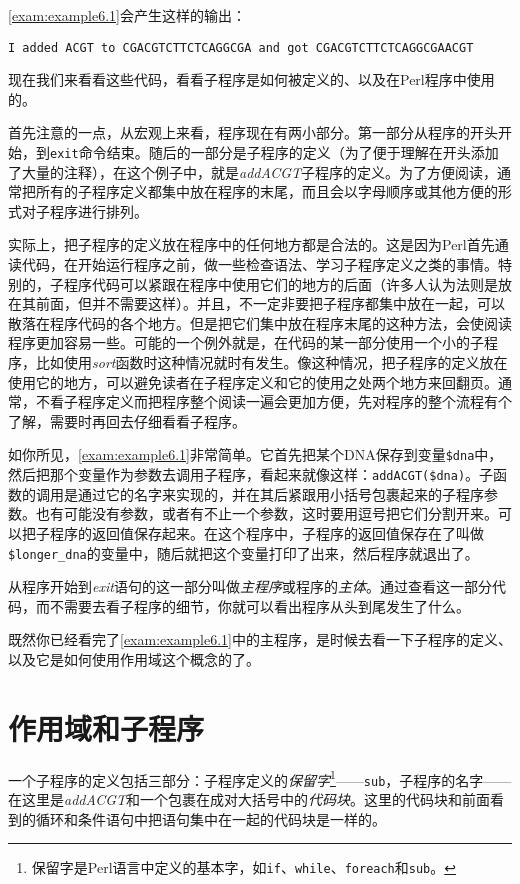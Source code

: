 \autoref{exam:example6.1}会产生这样的输出：

\begin{lstlisting}
I added ACGT to CGACGTCTTCTCAGGCGA and got CGACGTCTTCTCAGGCGAACGT
\end{lstlisting}

现在我们来看看这些代码，看看子程序是如何被定义的、以及在Perl程序中使用的。

首先注意的一点，从宏观上来看，程序现在有两小部分。第一部分从程序的开头开始，到\verb|exit|命令结束。随后的一部分是子程序的定义（为了便于理解在开头添加了大量的注释），在这个例子中，就是\textit{addACGT}子程序的定义。为了方便阅读，通常把所有的子程序定义都集中放在程序的末尾，而且会以字母顺序或其他方便的形式对子程序进行排列。

实际上，把子程序的定义放在程序中的任何地方都是合法的。这是因为Perl首先通读代码，在开始运行程序之前，做一些检查语法、学习子程序定义之类的事情。特别的，子程序代码可以紧跟在程序中使用它们的地方的后面（许多人认为法则是放在其前面，但并不需要这样）。并且，不一定非要把子程序都集中放在一起，可以散落在程序代码的各个地方。但是把它们集中放在程序末尾的这种方法，会使阅读程序更加容易一些。可能的一个例外就是，在代码的某一部分使用一个小的子程序，比如使用\textit{sort}函数时这种情况就时有发生。像这种情况，把子程序的定义放在使用它的地方，可以避免读者在子程序定义和它的使用之处两个地方来回翻页。通常，不看子程序定义而把程序整个阅读一遍会更加方便，先对程序的整个流程有个了解，需要时再回去仔细看看子程序。

如你所见，\autoref{exam:example6.1}非常简单。它首先把某个DNA保存到变量\verb|$dna|中，然后把那个变量作为参数去调用子程序，看起来就像这样：\verb|addACGT($dna)|。子函数的调用是通过它的名字来实现的，并在其后紧跟用小括号包裹起来的子程序参数。也有可能没有参数，或者有不止一个参数，这时要用逗号把它们分割开来。可以把子程序的返回值保存起来。在这个程序中，子程序的返回值保存在了叫做\verb|$longer_dna|的变量中，随后就把这个变量打印了出来，然后程序就退出了。

从程序开始到\textit{exit}语句的这一部分叫做\textit{主程序}或程序的\textit{主体}。通过查看这一部分代码，而不需要去看子程序的细节，你就可以看出程序从头到尾发生了什么。

既然你已经看完了\autoref{exam:example6.1}中的主程序，是时候去看一下子程序的定义、以及它是如何使用作用域这个概念的了。

\section{作用域和子程序}
一个子程序的定义包括三部分：子程序定义的\textit{保留字}\footnote{保留字是Perl语言中定义的基本字，如\verb|if|、\verb|while|、\verb|foreach|和\verb|sub|。}——\verb|sub|，子程序的名字——在这里是\textit{addACGT}和一个包裹在成对大括号中的\textit{代码块}。这里的代码块和前面看到的循环和条件语句中把语句集中在一起的代码块是一样的。

